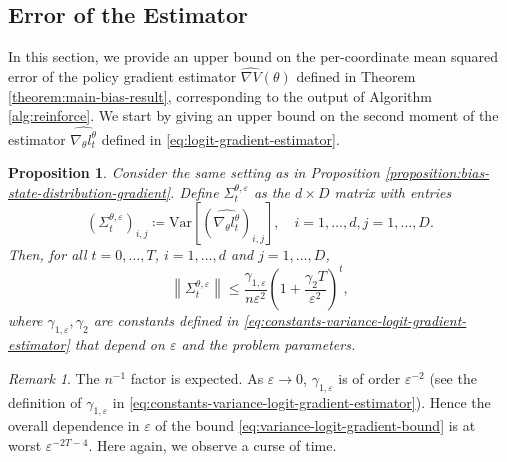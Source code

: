 \documentclass[11pt]{article}
\numberwithin{equation}{section}
\newtheorem{proposition}[theorem]{Proposition}
\theoremstyle{definition}
\theoremstyle{remark}
\newtheorem{remark}{Remark}[section]
\def\eps{\varepsilon}
\def\var{{\mathrm{Var}}}
\begin{document}
\subsection{Error of the Estimator}\label{subsection:error}
In this section, we provide an upper bound on the per-coordinate mean squared error of the policy gradient estimator $\widehat{\nabla V}(\theta)$ defined in Theorem \ref{theorem:main-bias-result}, 
corresponding to the output of Algorithm \ref{alg:reinforce}.
We start by giving an upper bound on the second moment of the estimator $\widehat{\nabla_\theta l_t^\theta}$ defined in \eqref{eq:logit-gradient-estimator}.
\begin{proposition}
\label{proposition:l2-logit-gradient-estimator}
Consider the same setting as in Proposition \ref{proposition:bias-state-distribution-gradient}.
Define $\Sigma_{t}^{\theta, \eps}$ as the $d \times D$ matrix with entries 
\[
\left(\Sigma_{t}^{\theta,\eps} \right)_{i,j} \coloneq \var \left[ \left( \widehat{\nabla_\theta l_t^\theta} \right)_{i,j} \right], \quad i = 1,\ldots, d, j=1,\ldots, D.
\]
Then, for all $t = 0, \ldots, T$, $i = 1, \ldots, d$ and $j = 1, \ldots, D$,
\begin{equation}
\label{eq:variance-logit-gradient-bound}
\left\| \Sigma_{t}^{\theta, \eps} \right\| \leq  \frac{\gamma_{1, \eps}}{n \eps^2}  \left(1 + \frac{\gamma_{2} T}{\eps^2}\right)^t,
\end{equation}
where $\gamma_{1, \eps}, \gamma_2$ are constants defined in \eqref{eq:constants-variance-logit-gradient-estimator} that depend on $\eps$ and the problem parameters. 
\end{proposition}

\begin{remark}
\label{remark:variance-logit-gradient-estimator}
    The $n^{-1}$ factor is expected. As $\eps \to 0$, $\gamma_{1,\eps}$ is of order $\eps^{-2}$ (see the definition of $\gamma_{1, \eps}$ in \eqref{eq:constants-variance-logit-gradient-estimator}). Hence the overall dependence in $\eps$ of the bound \eqref{eq:variance-logit-gradient-bound} is at worst $\eps^{-2T - 4}$.  Here again, we observe a curse of time.
    \end{remark}
\end{document}
